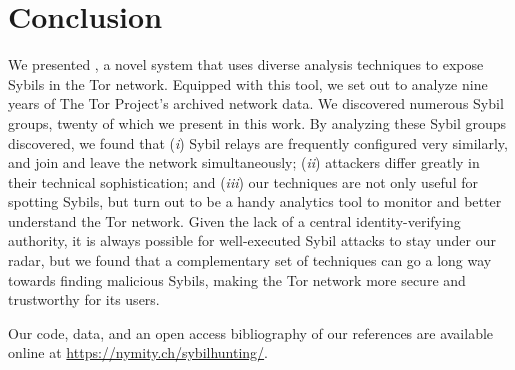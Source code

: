 \section{Conclusion}
\label{sec:conclusion}
We presented \sys, a novel system that uses diverse analysis techniques to
expose Sybils in the Tor network.  Equipped with this tool, we set out to
analyze nine years of The Tor Project's archived network data.  We discovered
numerous Sybil groups, twenty of which we present in this work.  By analyzing
these Sybil groups \sys discovered, we found that (\emph{i}) Sybil relays are
frequently configured very similarly, and join and leave the network
simultaneously; (\emph{ii}) attackers differ greatly in their technical
sophistication; and (\emph{iii}) our techniques are not only useful for spotting
Sybils, but turn out to be a handy analytics tool to monitor and better
understand the Tor network.  Given the lack of a central identity-verifying
authority, it is always possible for well-executed Sybil attacks to stay under
our radar, but we found that a complementary set of techniques can go a long way
towards finding malicious Sybils, making the Tor network more secure and
trustworthy for its users.

Our code, data, and an open access bibliography of our references are available
online at \url{https://nymity.ch/sybilhunting/}.
